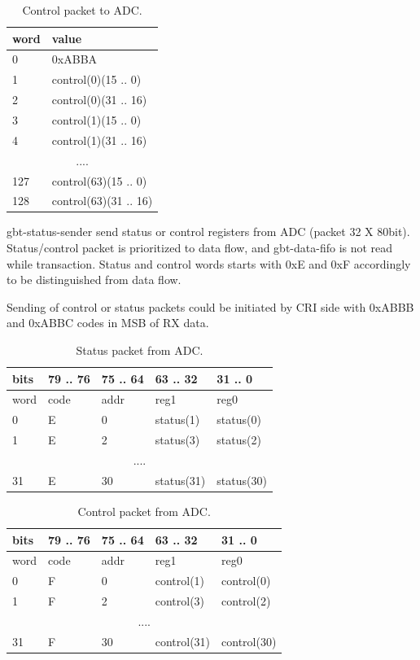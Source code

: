 \documentclass{article}
\begin{document}
\begin{table}[H]
\centering
\begin{tabular}{| l | l |}
\hline
word & value \\ \hline
0 & 0xABBA \\ \hline
1 & control(0)(15 .. 0) \\ \hline
2 & control(0)(31 .. 16) \\ \hline
3 & control(1)(15 .. 0) \\ \hline
4 & control(1)(31 .. 16) \\ \hline
\multicolumn{2}{|c|}{....} \\ \hline
127 & control(63)(15 .. 0) \\ \hline
128 & control(63)(31 .. 16) \\ \hline
\end{tabular}
\caption{Control packet to ADC.\label{tab4}}
\end{table}


gbt-status-sender send status or control registers from ADC (packet 32 X 80bit).  Status/control packet is prioritized to data flow, and gbt-data-fifo is not read while transaction. Status and control words starts with 0xE and 0xF accordingly to be distinguished from data flow. 

Sending of control or status packets could be initiated by CRI side with 0xABBB and 0xABBC codes in MSB of RX data.

\begin{table}[H]
\centering
\begin{tabular}{| l | l | l | l | l |}
\hline
 bits & 79 .. 76 & 75 .. 64 & 63 .. 32 & 31 .. 0 \\ \hline
word & code & addr & reg1 & reg0 \\ \hline
0 & E & 0 & status(1) & status(0) \\ \hline
1 & E & 2 & status(3) & status(2) \\ \hline
\multicolumn{5}{|c|}{....} \\ \hline
31 & E & 30 & status(31) & status(30) \\ \hline
\end{tabular}
\caption{Status packet from ADC.\label{tab4}}
\end{table}


\begin{table}[H]
\centering
\begin{tabular}{| l | l | l | l | l |}
\hline
 bits & 79 .. 76 & 75 .. 64 & 63 .. 32 & 31 .. 0 \\ \hline
word & code & addr & reg1 & reg0 \\ \hline
0 & F & 0 & control(1) & control(0) \\ \hline
1 & F & 2 & control(3) & control(2) \\ \hline
\multicolumn{5}{|c|}{....} \\ \hline
31 & F & 30 & control(31) & control(30) \\ \hline
\end{tabular}
\caption{Control packet from ADC.\label{tab4}}
\end{table}
\end{document}
